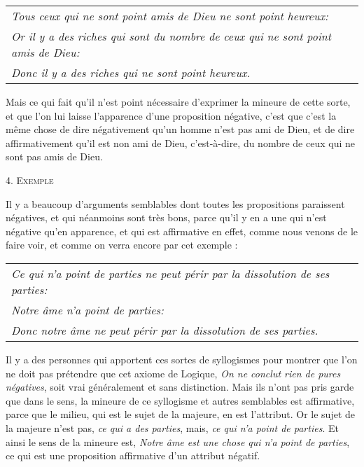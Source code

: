 	\begin{tabularx}{\textwidth}{X}
		\emph{Tous ceux qui ne sont point amis de Dieu ne sont point heureux:} \\
		\emph{Or il y a des riches qui sont du nombre de ceux qui ne sont point amis de Dieu:} \\
		\emph{Donc il y a des riches qui ne sont point heureux.} \\
	\end{tabularx}

Mais ce qui fait qu'il n'est point nécessaire d'exprimer la mineure de cette sorte, et que l'on lui laisse l'apparence d'une proposition négative, c'est que c'est la même chose de dire négativement qu'un homme n'est pas ami de Dieu, et de dire affirmativement qu'il est non ami de Dieu, c'est-à-dire, du nombre de ceux qui ne sont pas amis de Dieu.

\newpage

\begin{center}{\scshape 4. Exemple}\end{center}

Il y a beaucoup d'arguments semblables dont toutes les propositions paraissent négatives, et qui néanmoins sont très bons, parce qu'il y en a une qui n'est négative qu'en apparence, et qui est affirmative en effet, comme nous venons de le faire voir, et comme on verra encore par cet exemple :

	\begin{tabularx}{\textwidth}{X}
		\emph{Ce qui n'a point de parties ne peut périr par la dissolution de ses parties:} \\
		\emph{Notre âme n'a point de parties:} \\
		\emph{Donc notre âme ne peut périr par la dissolution de ses parties.} \\
	\end{tabularx}

Il y a des personnes qui apportent ces sortes de syllogismes pour montrer que l'on ne doit pas prétendre que cet axiome de Logique, \emph{On ne conclut rien de pures négatives}, soit vrai généralement et sans distinction. Mais ils n'ont pas pris garde que dans le sens, la mineure de ce syllogisme et autres semblables est affirmative, parce que le milieu, qui est le sujet de la majeure, en est l'attribut. Or le sujet de la majeure n'est pas, \emph{ce qui a des parties}, mais, \emph{ce qui n'a point de parties}. Et ainsi le sens de la mineure est, \emph{Notre âme est une chose qui n'a point de parties}, ce qui est une proposition affirmative d'un attribut négatif.

